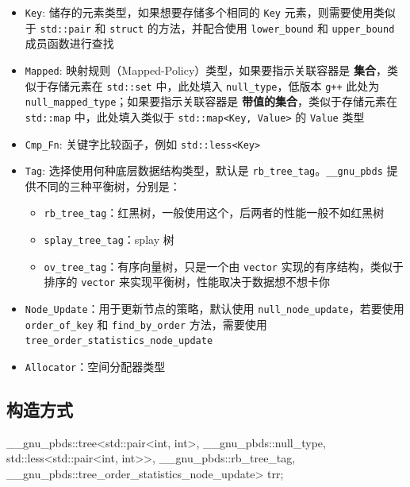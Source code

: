 \begin{itemize}
\tightlist
\item
  \texttt{Key}: 储存的元素类型，如果想要存储多个相同的 \texttt{Key} 元素，则需要使用类似于 \texttt{std::pair} 和 \texttt{struct} 的方法，并配合使用 \texttt{lower\_bound} 和 \texttt{upper\_bound} 成员函数进行查找
\item
  \texttt{Mapped}: 映射规则（Mapped-Policy）类型，如果要指示关联容器是 \textbf{集合}，类似于存储元素在 \texttt{std::set} 中，此处填入 \texttt{null\_type}，低版本 \texttt{g++} 此处为 \texttt{null\_mapped\_type}；如果要指示关联容器是 \textbf{带值的集合}，类似于存储元素在 \texttt{std::map} 中，此处填入类似于 \texttt{std::map\textless{}Key,\ Value\textgreater{}} 的 \texttt{Value} 类型
\item
  \texttt{Cmp\_Fn}: 关键字比较函子，例如 \texttt{std::less\textless{}Key\textgreater{}}
\item
  \texttt{Tag}: 选择使用何种底层数据结构类型，默认是 \texttt{rb\_tree\_tag}。\texttt{\_\_gnu\_pbds} 提供不同的三种平衡树，分别是：

  \begin{itemize}
  \tightlist
  \item
    \texttt{rb\_tree\_tag}：红黑树，一般使用这个，后两者的性能一般不如红黑树
  \item
    \texttt{splay\_tree\_tag}：splay 树
  \item
    \texttt{ov\_tree\_tag}：有序向量树，只是一个由 \texttt{vector} 实现的有序结构，类似于排序的 \texttt{vector} 来实现平衡树，性能取决于数据想不想卡你
  \end{itemize}
\item
  \texttt{Node\_Update}：用于更新节点的策略，默认使用 \texttt{null\_node\_update}，若要使用 \texttt{order\_of\_key} 和 \texttt{find\_by\_order} 方法，需要使用 \texttt{tree\_order\_statistics\_node\_update}
\item
  \texttt{Allocator}：空间分配器类型
\end{itemize}

\subsection{构造方式}\label{ux6784ux9020ux65b9ux5f0f-1}


\begin{codeline}
__gnu_pbds::tree<std::pair<int, int>, __gnu_pbds::null_type,
                 std::less<std::pair<int, int>>, __gnu_pbds::rb_tree_tag,
                 __gnu_pbds::tree_order_statistics_node_update>
    trr;
\end{codeline}


